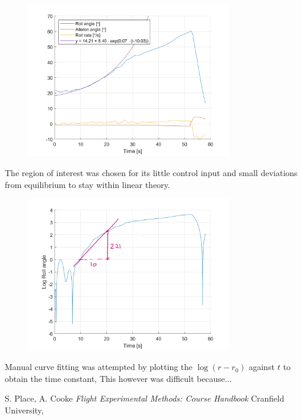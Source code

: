 \documentclass{article}
\begin{document}
\begin{figure}[H]
  \centering
  \includegraphics[width=0.8\textwidth]{figures/Spiral.png}
  \caption{}
  \label{fig:spiral}
\end{figure}

The region of interest was chosen for its little control input and small deviations from equilibrium to stay within linear theory.

\begin{figure}[H]
  \centering
  \includegraphics[width=0.8\textwidth]{figures/anSpiral_log.png}
  \caption{}
  \label{fig:spiral_log}
\end{figure}

Manual curve fitting was attempted by plotting the $\log(r - r_0)$ against $t$ to obtain the time constant,
This however was difficult because...


\begin{thebibliography}{9}

  S. Place, A. Cooke
  \emph{Flight Experimental Methods: Course Handbook}
  Cranfield University,

\end{thebibliography}
\end{document}
